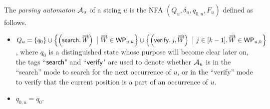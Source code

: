 \begin{definition}
The \emph{parsing automaton} $\mathcal{A}_u$ of a string $u$ is the NFA $(Q_u, \delta_u, q_{0,u}, F_u)$ defined as follows.
\begin{itemize}
	\item  $Q_u =\left\{q_0 \right\} \cup \left\{ \left(\mathsf{search}, \overrightarrow{W} \right)\ \big\vert\ \overrightarrow{W} \in \mathsf{WP}_{u, k} \right\} \cup  \left\{ \left(\mathsf{verify}, j, \overrightarrow{W} \right) \ \big\vert\ j \in [k-1], \overrightarrow{W} \in \mathsf{WP}_{u,k} \right\}$, where $q_0$ is a distinguished state whose purpose will become clear later on,  the tags ``$\mathsf{search}$" and ``$\mathsf{verify}$" are used to denote whether $\mathcal{A}_u$ is in the ``search'' mode to search for the next occurrence of $u$, or in the ``verify'' mode to verify that the current position is a part of an occurrence of $u$.
	\item $q_{0,u}=q_0$.


\end{itemize}
\end{definition}
